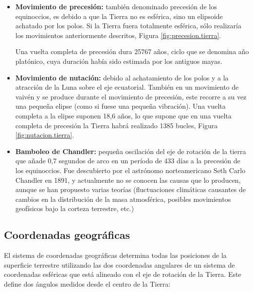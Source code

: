 \documentclass[a4paper,12pt,twoside]{article}
\begin{document}
\begin{itemize}
\item \textbf{Movimiento de precesión:} 
también denominado precesión de los equinoccios, es debido a que la Tierra no es esférica, sino un elipsoide achatado por los polos. Si la Tierra fuera totalmente esférica, sólo realizaría los movimientos anteriormente descritos, Figura \ref{fig:precesion.tierra}.

Una vuelta completa de precesión dura 25767 años, ciclo que se denomina año platónico, cuya duración había sido estimada por los antiguos mayas.

\item \textbf{Movimiento de nutación:} debido al achatamiento de los polos y a la atracción de la Luna sobre el eje ecuatorial. También en un movimiento de vaivén y se produce durante el movimiento de precesión, este recorre a su vez una pequeña elipse (como si fuese una pequeña vibración). Una vuelta completa a la elipse suponen 18,6 años, lo que supone que en una vuelta completa de precesión la Tierra habrá realizado 1385 bucles, Figura \ref{fig:nutacion.tierra}.

\item \textbf{Bamboleo de Chandler:} pequeña oscilación del eje de rotación de la tierra que añade 0,7 segundos de arco en un período de 433 días a la precesión de los equinoccios. Fue descubierto por el astrónomo norteamericano Seth Carlo Chandler en 1891, y actualmente no se conocen las causas que lo producen, aunque se han propuesto varias teorías (fluctuaciones climáticas causantes de cambios en la distribución de la masa atmosférica, posibles movimientos geofísicos bajo la corteza terrestre, etc.)


\end{itemize}


\subsection{Coordenadas geogr\'aficas}

El sistema de coordenadas geogr\'aficas determina todas las posiciones de la superficie terrestre utilizando las dos coordenadas angulares de un sistema de coordenadas esf\'ericas que est\'a alineado con el eje de rotaci\'on de la Tierra. Este define dos \'angulos medidos desde el centro de la Tierra:
\end{document}
